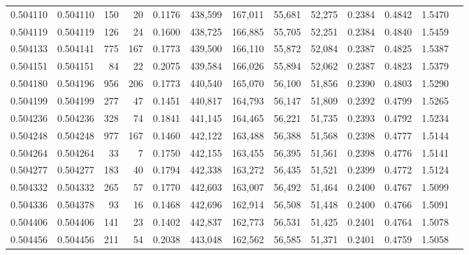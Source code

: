 \begin{tabular}{rrrrrrrrrrrrr}
0.504110 & 0.504110 &   150 &    20 &                                     0.1176 & 438,599 & 167,011 &  55,681 &  52,275 & 0.2384 & 0.4842 & 1.5470 \\
0.504119 & 0.504119 &   126 &    24 &                                     0.1600 & 438,725 & 166,885 &  55,705 &  52,251 & 0.2384 & 0.4840 & 1.5459 \\
0.504133 & 0.504141 &   775 &   167 &                                     0.1773 & 439,500 & 166,110 &  55,872 &  52,084 & 0.2387 & 0.4825 & 1.5387 \\
0.504151 & 0.504151 &    84 &    22 &                                     0.2075 & 439,584 & 166,026 &  55,894 &  52,062 & 0.2387 & 0.4823 & 1.5379 \\
0.504180 & 0.504196 &   956 &   206 &                                     0.1773 & 440,540 & 165,070 &  56,100 &  51,856 & 0.2390 & 0.4803 & 1.5290 \\
0.504199 & 0.504199 &   277 &    47 &                                     0.1451 & 440,817 & 164,793 &  56,147 &  51,809 & 0.2392 & 0.4799 & 1.5265 \\
0.504236 & 0.504236 &   328 &    74 &                                     0.1841 & 441,145 & 164,465 &  56,221 &  51,735 & 0.2393 & 0.4792 & 1.5234 \\
0.504248 & 0.504248 &   977 &   167 &                                     0.1460 & 442,122 & 163,488 &  56,388 &  51,568 & 0.2398 & 0.4777 & 1.5144 \\
0.504264 & 0.504264 &    33 &     7 &                                     0.1750 & 442,155 & 163,455 &  56,395 &  51,561 & 0.2398 & 0.4776 & 1.5141 \\
0.504277 & 0.504277 &   183 &    40 &                                     0.1794 & 442,338 & 163,272 &  56,435 &  51,521 & 0.2399 & 0.4772 & 1.5124 \\
0.504332 & 0.504332 &   265 &    57 &                                     0.1770 & 442,603 & 163,007 &  56,492 &  51,464 & 0.2400 & 0.4767 & 1.5099 \\
0.504336 & 0.504378 &    93 &    16 &                                     0.1468 & 442,696 & 162,914 &  56,508 &  51,448 & 0.2400 & 0.4766 & 1.5091 \\
0.504406 & 0.504406 &   141 &    23 &                                     0.1402 & 442,837 & 162,773 &  56,531 &  51,425 & 0.2401 & 0.4764 & 1.5078 \\
0.504456 & 0.504456 &   211 &    54 &                                     0.2038 & 443,048 & 162,562 &  56,585 &  51,371 & 0.2401 & 0.4759 & 1.5058 \\

\end{tabular}
